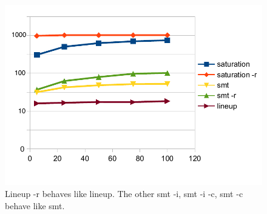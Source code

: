 \begin{figure}[t]
  \centering
  \includegraphics[width=\linewidth]{figures/chart_final}
  \caption{Lineup -r behaves like lineup. The other smt -i, smt -i -c, smt -c behave like smt.
  }
  \label{fig:data:chart}
\end{figure}







